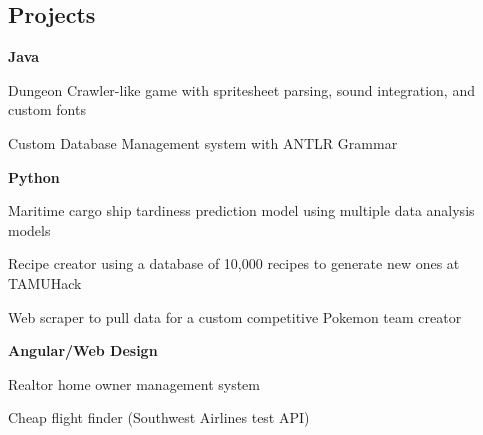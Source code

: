 \documentclass[10pt,letterpaper]{article}
\newenvironment{indentsection}[1]%
{\begin{list}{}%
	{\setlength{\leftmargin}{#1}}%
	\item[]%
}
{\end{list}}
\begin{document}
	\subsection*{Projects}
	\begin{indentsection}{\parindent}
		\begin{itemize*}
		\item \textbf{Java} 
		\vspace{-0.2em}
			\begin{itemize*}
				\item Dungeon Crawler-like game with spritesheet parsing, sound integration, and custom fonts 
				\item Custom Database Management system with ANTLR Grammar
			\end{itemize*}
		\item \textbf{Python}
		\vspace{-0.2em}
			\begin{itemize*}
				\item Maritime cargo ship tardiness prediction model using multiple data analysis models
				\item Recipe creator using a database of 10,000 recipes to generate new ones at TAMUHack 
				\item Web scraper to pull data for a custom competitive Pokemon team creator
		\end{itemize*}
		\item \textbf{Angular/Web Design}
		\vspace{-0.2em}
			\begin{itemize*}
				\item Realtor home owner management system
				\item Cheap flight finder (Southwest Airlines test API)
			\end{itemize*}
		\end{itemize*}
	\end{indentsection}
\end{document}
